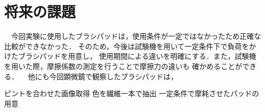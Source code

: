 \documentclass[main]{subfiles}
\begin{document}
\chapter{将来の課題}
　今回実験に使用したブラシパッドは，使用条件が一定ではなかったため正確な比較ができなかった．
そのため，今後は試験機を用いて一定条件下で負荷をかけたブラシパッドを用意し，
使用期間による違いを明確にする．また，試験機を用いた際，摩擦係数の測定を行うことで摩擦力の違いも
確かめることができる．
　他にも今回顕微鏡で観察したブラシパッドは，

ピントを合わせた画像取得
色を繊維一本で抽出
一定条件で摩耗させたパッドの用意
\end{document}
